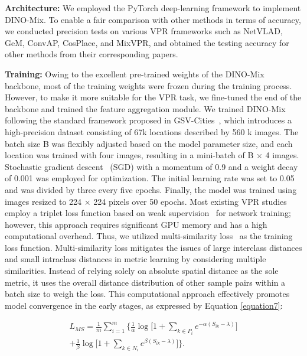 \textbf{Architecture:} We employed the PyTorch deep-learning framework to implement DINO-Mix. To enable a fair comparison with other methods in terms of accuracy, we conducted precision tests on various VPR frameworks such as NetVLAD, GeM, ConvAP, CosPlace, and MixVPR, and obtained the testing accuracy for other methods from their corresponding papers.

\textbf{Training:} Owing to the excellent pre-trained weights of the DINO-Mix backbone, most of the training weights were frozen during the training process. However, to make it more suitable for the VPR task, we fine-tuned the end of the backbone and trained the feature aggregation module. We trained DINO-Mix following the standard framework proposed in GSV-Cities~\cite{ali-bey_gsv-cities_2022}, which introduces a high-precision dataset consisting of 67k locations described by 560 k images. The batch size B was flexibly adjusted based on the model parameter size, and each location was trained with four images, resulting in a mini-batch of B × 4 images. Stochastic gradient descent~\cite{ruder_overview_2017} (SGD) with a momentum of 0.9 and a weight decay of 0.001 was employed for optimization. The initial learning rate was set to 0.05 and was divided by three every five epochs. Finally, the model was trained using images resized to 224 × 224 pixels over 50 epochs. Most existing VPR studies employ a triplet loss function based on weak supervision~\cite{hermans_defense_2018} for network training; however, this approach requires significant GPU memory and has a high computational overhead. Thus, we utilized multi-similarity loss~\cite{wang_multi-similarity_2019} as the training loss function. Multi-similarity loss mitigates the issues of large interclass distances and small intraclass distances in metric learning by considering multiple similarities. Instead of relying solely on absolute spatial distance as the sole metric, it uses the overall distance distribution of other sample pairs within a batch size to weigh the loss. This computational approach effectively promotes model convergence in the early stages, as expressed by Equation \ref{equation7}:


\begin{equation}
\label{equation7}
\begin{split}
    L_{MS} = \frac{1}{m}\sum_{i=1}^{m}  \bigg\{\frac{1}{\alpha}  { \log \big[1 + \sum_{k  \in P_{i} } e^{-\alpha (S_{ik} - \lambda)}}\big]  \\
    + \frac{1}{\beta }  { \log \big[1+ \sum_{k \in N_{i}}e^{\beta (S_{ik} - \lambda)} \big]} \bigg\}.
\end{split} 
\end{equation}

